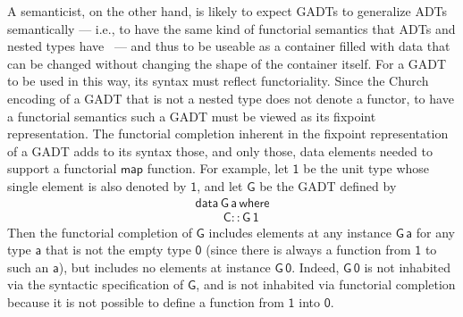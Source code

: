 \documentclass[submission,copyright,creativecommons]{eptcs}
\begin{document}
A semanticist, on the other hand, is likely to expect GADTs to
generalize ADTs semantically --- i.e., to have the same kind of
functorial semantics that ADTs and nested types
have~\cite{bm98,jg07,jp19} --- and thus to be useable as a container
filled with data that can be changed without changing the shape of the
container itself.  For a GADT to be used in this way, its syntax must
reflect functoriality. Since the Church encoding of a GADT that is not
a nested type does not denote a functor, to have a functorial
semantics such a GADT must be viewed as its fixpoint
representation. The functorial completion inherent in the fixpoint
representation of a GADT adds to its syntax those, and only those,
data elements needed to support a functorial $\mathsf{map}$ function.
For example, let $\mathsf{1}$ be the unit type whose single element is
also denoted by $\mathsf{1}$, and let $\mathsf{G}$ be the GADT defined
by
\begin{equation}\label{eq:G}
\begin{array}{l}
\mathsf{data\,G\,a\,where}\\
\mathsf{\;\;\;\;\;\;\;\;C :: G\,1}
\end{array}
\end{equation}
Then the functorial completion of $\mathsf{G}$ includes elements at
any instance $\mathsf{G\,a}$ for any type $\mathsf{a}$ that is not the
empty type $\mathsf{0}$ (since there is always a function from
$\mathsf{1}$ to such an $\mathsf{a}$), but includes no elements at
instance $\mathsf{G\,0}$. Indeed, $\mathsf{G\,0}$ is not inhabited via
the syntactic specification of $\mathsf{G}$, and is not inhabited via
functorial completion because it is not possible to define a function
from $\mathsf{1}$ into $\mathsf{0}$.
\end{document}

